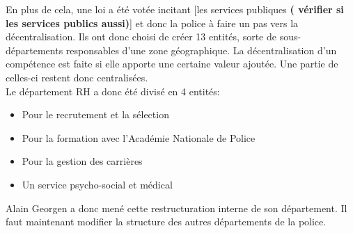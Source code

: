 En plus de cela, une loi a été votée incitant [les services publiques \textbf{( vérifier si les services publics aussi)}] et donc la police à faire un pas vers la décentralisation. Ils ont donc choisi de créer 13 entités, sorte de sous-départements responsables d'une zone géographique. La décentralisation d'un compétence est faite si elle apporte une certaine valeur ajoutée. Une partie de celles-ci restent donc centralisées.\\

Le département RH a donc été divisé en 4 entités:
\begin{itemize}
	\item Pour le recrutement et la sélection
	\item Pour la formation avec l'Académie Nationale de Police
	\item Pour la gestion des carrières
	\item Un service psycho-social et médical
\end{itemize}

Alain Georgen a donc mené cette restructuration interne de son département. Il faut maintenant modifier la structure des autres départements de la police.\\




